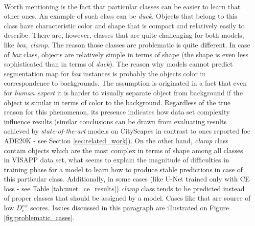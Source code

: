 \documentclass{article}
\begin{document}
\paragraph{}
Worth mentioning is the fact that particular classes can be easier to learn that other ones. An example of such class can be \textit{duck}. Objects that belong to this class have characteristic color and shape that is compact and relatively easily to describe. There are, however, classes that are quite challenging for both models, like \textit{box}, \textit{clamp}. The reason those classes are problematic is quite different. In case of \textit{box} class, objects are relatively simple in terms of shape (the shape is even less sophisticated than in terms of \textit{duck}). The reason why models cannot predict segmentation map for \textit{box} instances is probably the objects color in correspondence to backgrounds. The assumption is originated in a fact that even for \textit{human expert} it is harder to visually separate object from background if the object is similar in terms of color to the background. Regardless of the true reason for this phenomenon, its presence indicates how data set complexity influence results (similar conclusions can be drawn from evaluating results achieved by \textit{state-of-the-art} models on CityScapes \cite{cityscapes} in contrast to ones reported foe ADE20K \cite{ade20k} - see Section \ref{sec:related_work}). On the other hand, \textit{clamp} class contain objects which are the most complex in terms of shape among all classes in VISAPP \cite{visapp} data set, what seems to explain the magnitude of difficulties in training phase for a model to learn how to produce stable predictions in case of this particular class. Additionally, in some cases (like U-Net \cite{unet} trained only with CE loss - see Table \ref{tab:unet_ce_results}) \textit{clamp} class tends to be predicted instead of proper classes that should be assigned by a model. Cases like that are source of low $D^{ew}_{c}$ scores. Issues discussed in this paragraph are illustrated on Figure \ref{fig:problematic_cases}.
\end{document}
